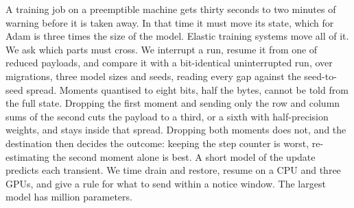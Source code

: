 A training job on a preemptible machine gets thirty seconds to two minutes of warning before it is taken away. In
that time it must move its state, which for Adam is three times the size of the model. Elastic training systems move
all of it. We ask which parts must cross. We interrupt a run, resume it from one of \nArms{} reduced payloads, and
compare it with a bit-identical uninterrupted run, over \nCells{} migrations, three model sizes and \nSeedsMax{}
seeds, reading every gap against the seed-to-seed spread. Moments quantised to eight bits, half the bytes, cannot be
told from the full state. Dropping the first moment and sending only the row and column sums of the second cuts the
payload to a third, or a sixth with half-precision weights, and stays inside that spread. Dropping both moments does
not, and the destination then decides the outcome: keeping the step counter is worst, re-estimating the second moment
alone is best. A short model of the update predicts each transient. We time drain and restore, resume on a CPU and
three GPUs, and give a rule for what to send within a notice window. The largest model has \largeParams{} million
parameters.
